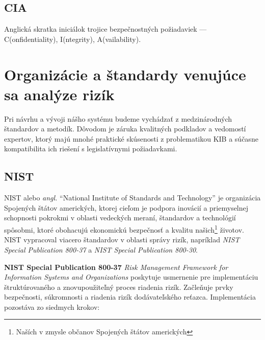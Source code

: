 \subsection*{CIA}
Anglická skratka iniciálok trojice bezpečnostných požiadaviek --- C(onfidentiality), I(ntegrity), A(vailability).

\section{Organizácie a štandardy venujúce sa analýze rizík}

Pri návrhu a vývoji nášho systému budeme vychádzať z medzinárodných štandardov a metodík. Dôvodom je záruka kvalitných podkladov a vedomostí expertov,
ktorý majú mnohé praktické skúsenosti z problematikou KIB a súčasne kompatibilita ich riešení s legislatívnymi požiadavkami.

\subsection*{NIST}

NIST alebo \textit{angl.} \enquote{National Institute of Standards and Technology} je organizácia Spojených štátov amerických, ktorej cieľom je podpora inovácií
a priemyselnej schopnosti pokrokmi v oblasti vedeckých meraní, štandardov a technológií spôsobmi, ktoré obohacujú ekonomickú bezpečnosť a kvalitu
našich\footnote{Naších v zmysle občanov Spojených štátov amerických} životov\cite{nist_about}. NIST vypracoval viacero štandardov v oblasti správy rizík,
napríklad \textit{NIST Special Publication 800-37}\cite{nist_sp_800_37} a \textit{NIST Special Publication 800-30}\cite{nist_sp_800_30}.

\textbf{NIST Special Publication 800-37} \textit{Risk Management Framework for Information Systems and Organizations} poskytuje usmernenie pre implementáciu
štruktúrovaného a znovupoužiteľný proces riadenia rizík. Začleňuje prvky bezpečnosti, súkromnosti a riadenia rizík dodávateľského reťazca. Implementácia pozostáva
zo siedmych krokov:

